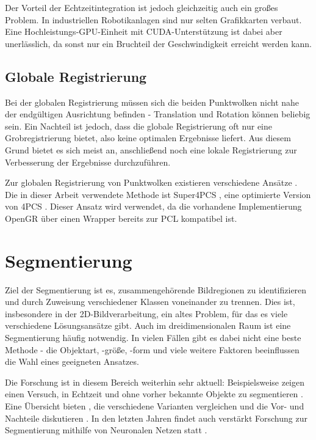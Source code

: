 Der Vorteil der Echtzeitintegration ist jedoch gleichzeitig auch ein großes Problem.
In industriellen Robotikanlagen sind nur selten Grafikkarten verbaut.
Eine Hochleistungs-GPU-Einheit mit \ac{CUDA}-Unterstützung ist dabei aber unerlässlich, da sonst nur ein Bruchteil der Geschwindigkeit erreicht werden kann.


\subsection{Globale Registrierung}
\label{subsec:global-registration}

Bei der globalen Registrierung müssen sich die beiden Punktwolken nicht nahe der endgültigen Ausrichtung befinden - Translation und Rotation können beliebig sein.
Ein Nachteil ist jedoch, dass die globale Registrierung oft nur eine Grobregistrierung bietet, also keine optimalen Ergebnisse liefert.
Aus diesem Grund bietet es sich meist an, anschließend noch eine lokale Registrierung zur Verbesserung der Ergebnisse durchzuführen.

Zur globalen Registrierung von Punktwolken existieren verschiedene Ansätze \cite{chaudhury2015global, zhou2016fast, rusu2009fast}.
Die in dieser Arbeit verwendete Methode ist Super4PCS \cite{mellado2014super4pcs}, eine optimierte Version von \ac{4PCS} \cite{aiger2008fpcs}.
Dieser Ansatz wird verwendet, da die vorhandene Implementierung \ac{OpenGR} \cite{mellado2018opengr} über einen Wrapper bereits zur \ac{PCL} kompatibel ist.



\section{Segmentierung}
\label{sec:segmentation}

Ziel der Segmentierung ist es, zusammengehörende Bildregionen zu identifizieren und durch Zuweisung verschiedener Klassen voneinander zu trennen.
Dies ist, insbesondere in der 2D-Bildverarbeitung, ein altes Problem, für das es viele verschiedene Lösungsansätze gibt.
Auch im dreidimensionalen Raum ist eine Segmentierung häufig notwendig.
In vielen Fällen gibt es dabei nicht eine beste Methode - die Objektart, -größe, -form und viele weitere Faktoren beeinflussen die Wahl eines geeigneten Ansatzes.

Die Forschung ist in diesem Bereich weiterhin sehr aktuell:
Beispielsweise zeigen \citeauthor{uckermann2012real} einen Versuch, in Echtzeit und ohne vorher bekannte Objekte zu segmentieren \cite{uckermann2012real}.
Eine Übersicht bieten \citeauthor{nguyen20133d}, die verschiedene Varianten vergleichen und die Vor- und Nachteile diskutieren \cite{nguyen20133d}.
In den letzten Jahren findet auch verstärkt Forschung zur Segmentierung mithilfe von Neuronalen Netzen statt \cite{te2018rgcnn}.


